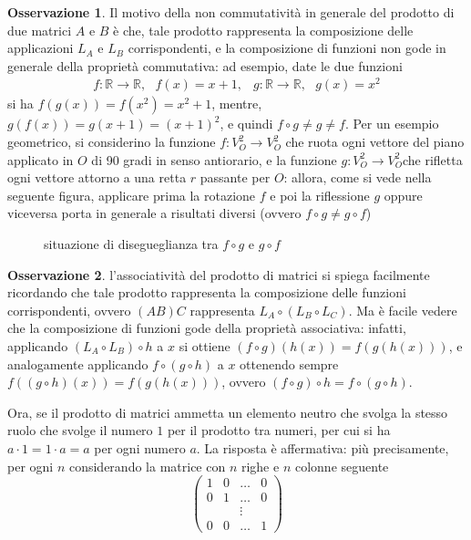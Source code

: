 \documentclass{book}
\theoremstyle{definition}
\newtheorem{oss}{Osservazione}[section]
\theoremstyle{plain}
\begin{document}
\begin{oss}
  \label{oss:Compinveeproddimatrici1}
  Il motivo della non commutatività in generale del prodotto di due matrici $A$ e $B$ è che, tale prodotto
  rappresenta la composizione delle applicazioni $L_A$ e $L_B$ corrispondenti, e la composizione di funzioni
  non gode in generale della proprietà commutativa: ad esempio, date le due funzioni
  \begin{eqnarray*}
    f:\mathds{R}\to \mathds{R},\text{ } f(x)=x+1, & g: \mathds{R}\to\mathds{R}, \text{ } g(x)=x^2
  \end{eqnarray*}
  si ha $f(g(x))=f(x^2)=x^2+1$, mentre, $g(f(x))=g(x+1)=(x+1)^2$, e quindi $f\circ g\neq g\neq f$. Per un
  esempio geometrico, si considerino la funzione $f:V_O^2\to V_O^2$ che ruota ogni vettore del piano applicato
  in $O$ di 90 gradi in senso antiorario, e la funzione $g:V_O^2\to V_O^2$che rifletta ogni vettore attorno a
  una retta $r$ passante per $O$: allora, come si vede nella seguente figura, applicare prima la rotazione $f$
  e poi la riflessione $g$ oppure viceversa porta in generale a risultati diversi (ovvero $f\circ g\neq
  g\circ f$)
  \begin{figure}[ht!]
    \centering
    \resizebox{9cm}{!}{}
    \caption{situazione di disegueglianza tra $f\circ g$ e $g\circ f$}
    \label{fig:Compinveeproddimatrici4}
  \end{figure}
\end{oss}
\begin{oss}
  \label{oss:Compinveeproddimatrici2}
  l'associatività del prodotto di matrici si spiega facilmente ricordando che tale prodotto rappresenta la
  composizione delle funzioni corrispondenti, ovvero $(AB)C$ rappresenta $L_A\circ (L_B\circ L_C)$. Ma è facile
  vedere che la composizione di funzioni gode della proprietà associativa: infatti, applicando $(L_A\circ
  L_B)\circ h$ a $x$ si ottiene $(f\circ g)(h(x))=f(g(h(x)))$, e analogamente applicando $f\circ(g\circ h)$ a
  $x$ ottenendo sempre $f((g\circ h)(x))=f(g(h(x)))$, ovvero $(f\circ g)\circ h=f\circ (g\circ h)$.
\end{oss}
Ora, se il prodotto di matrici ammetta un elemento neutro che svolga la stesso ruolo che svolge il numero $1$
per il prodotto tra numeri, per cui si ha $a\cdot 1=1\cdot a =a$ per ogni numero $a$. La risposta è
affermativa: più precisamente, per ogni $n$ considerando la matrice con $n$ righe e $n$ colonne seguente
\begin{equation}
  \label{eq:Compinveeproddimatrici6}
  \begin{pmatrix}
    1 & 0 & \dots & 0\\
    0 & 1 & \dots & 0\\
      && \vdots\\
    0 & 0 & \dots & 1
  \end{pmatrix}
\end{equation}
\end{document}
